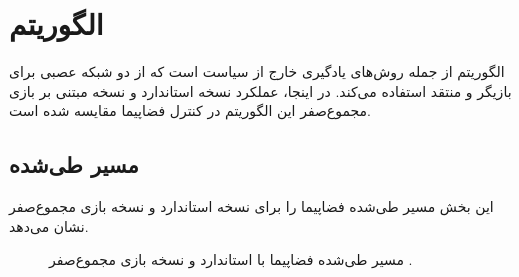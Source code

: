 \section{الگوریتم }
\label{sec:ddpg_results}

الگوریتم   از جمله روش‌های یادگیری خارج از سیاست است که از دو شبکه عصبی برای بازیگر و منتقد استفاده می‌کند. در اینجا، عملکرد نسخه استاندارد و نسخه مبتنی بر بازی مجموع‌صفر این الگوریتم در کنترل فضاپیما مقایسه شده است.

\subsection{مسیر طی‌شده}
این بخش مسیر طی‌شده فضاپیما را برای نسخه استاندارد و نسخه بازی مجموع‌صفر  نشان می‌دهد.
\begin{figure}[H]
	\centering
	
	
	\caption{مسیر طی‌شده فضاپیما با  استاندارد و نسخه بازی مجموع‌صفر
		.}
\end{figure}

